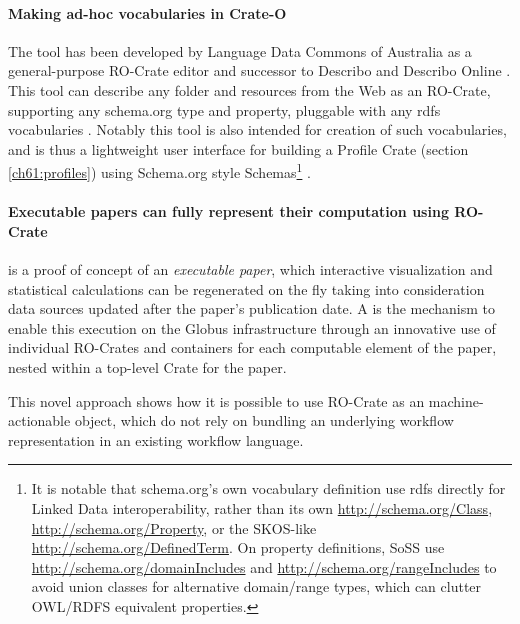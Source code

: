 \paragraph{Making ad-hoc vocabularies in Crate-O}\label{ch61:crate-o}
The  tool has been developed by Language Data Commons of Australia  as a general-purpose RO-Crate editor and successor to Describo \cite{ch5-78} and Describo Online \cite{ch5-77}. 
This tool can describe any folder and resources from the Web as an RO-Crate, supporting any schema.org type and property, pluggable with any rdfs vocabularies \cite{w3-rdf-schema}. 
Notably this tool is also intended for creation of such vocabularies, and is thus a lightweight user interface for building a Profile Crate (section \vref{ch61:profiles}) using Schema.org style Schemas\footnote{
  It is notable that schema.org's own vocabulary definition use rdfs directly for Linked Data interoperability, 
  rather than its own \url{http://schema.org/Class}, \url{http://schema.org/Property}, or the SKOS-like \url{http://schema.org/DefinedTerm}. 
  On property definitions, SoSS use \url{http://schema.org/domainIncludes} and \url{http://schema.org/rangeIncludes} to avoid union classes for alternative domain/range types, which can clutter OWL/RDFS equivalent properties.} 
.

\paragraph{Executable papers can fully represent their computation using RO-Crate}
\label{ch61:livepublication}

 \cite{Ellerm 2023} is a proof of concept of an \emph{executable paper}, which interactive visualization and statistical calculations can be regenerated on the fly taking into consideration data sources updated after the paper's publication date. A  is the mechanism to enable this execution on the Globus infrastructure through an innovative use of individual RO-Crates and containers for each computable element of the paper, nested within a top-level Crate for the paper.

This novel approach shows how it is possible to use RO-Crate as an machine-actionable object, which do not rely on bundling an underlying workflow representation in an existing workflow language.  

